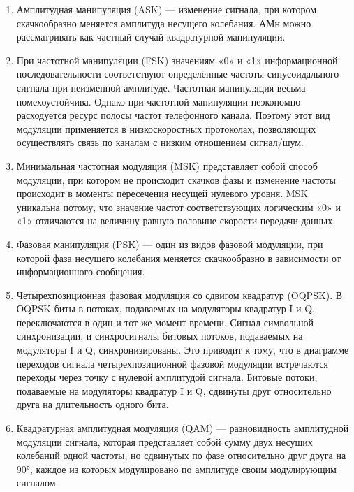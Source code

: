 \documentclass[10pt,a4paper]{report}
\begin{document}
\begin{enumerate}
\item Амплитудная манипуляция (ASK) — изменение сигнала, при котором скачкообразно меняется амплитуда несущего колебания. АМн можно рассматривать как частный случай квадратурной манипуляции.
\item При частотной манипуляции (FSK) значениям «0» и «1» информационной последовательности соответствуют определённые частоты синусоидального сигнала при неизменной амплитуде. Частотная манипуляция весьма помехоустойчива. Однако при частотной манипуляции неэкономно расходуется ресурс полосы частот телефонного канала. Поэтому этот вид модуляции применяется в низкоскоростных протоколах, позволяющих осуществлять связь по каналам с низким отношением сигнал/шум.
\item Минимальная частотная модуляция (MSK) представляет собой способ модуляции, при котором не происходит скачков фазы и изменение частоты происходит в моменты пересечения несущей нулевого уровня. MSK уникальна потому, что значение частот соответствующих логическим «0» и «1» отличаются на величину равную половине скорости передачи данных.
\item Фазовая манипуляция (PSK) — один из видов фазовой модуляции, при которой фаза несущего колебания меняется скачкообразно в зависимости от информационного сообщения.
\item Четырехпозиционная фазовая модуляция со сдвигом квадратур (OQPSK). В ОQPSK биты в потоках, подаваемых на модуляторы квадратур I и Q, переключаются в один и тот же момент времени. Сигнал символьной синхронизации, и синхросигналы битовых потоков, подаваемых на модуляторы I и Q, синхронизированы. Это приводит к тому, что в диаграмме переходов сигнала четырехпозиционной фазовой модуляции встречаются переходы через точку с нулевой амплитудой сигнала. Битовые потоки, подаваемые на модуляторы квадратур I и Q, сдвинуты друг относительно друга на длительность одного бита.
\item Квадратурная амплитудная модуляция (QAM) — разновидность амплитудной модуляции сигнала, которая представляет собой сумму двух несущих колебаний одной частоты, но сдвинутых по фазе относительно друг друга на 90°, каждое из которых модулировано по амплитуде своим модулирующим сигналом.
\end{enumerate}
\end{document}
